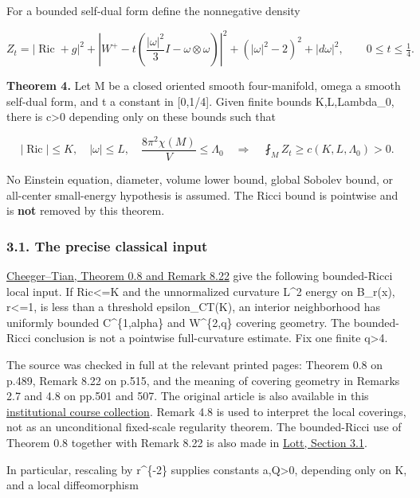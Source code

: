 \documentclass[
  10pt,
]{article}
\begin{document}
For a bounded self-dual form define the nonnegative density

\[
 Z_t=|\operatorname{Ric}+g|^2+
 \left|W^+-t\left(\frac{|\omega|^2}{3}I-\omega\otimes\omega\right)\right|^2
 +(|\omega|^2-2)^2+|d\omega|^2,
 \qquad 0\le t\le\tfrac14.                          \tag{3.1}
\]

\textbf{Theorem 4.} Let M be a closed oriented smooth four-manifold,
omega a smooth self-dual form, and t a constant in {[}0,1/4{]}. Given
finite bounds K,L,Lambda\_0, there is c\textgreater0 depending only on
these bounds such that

\[
 |\operatorname{Ric}|\le K,\quad |\omega|\le L,\quad
 \frac{8\pi^2\chi(M)}{V}\le\Lambda_0
 \quad\Longrightarrow\quad
 \boxed{\fint_M Z_t\ge c(K,L,\Lambda_0)>0.}           \tag{3.2}
\]

No Einstein equation, diameter, volume lower bound, global Sobolev
bound, or all-center small-energy hypothesis is assumed. The Ricci bound
is pointwise and is \textbf{not} removed by this theorem.

\hypertarget{the-precise-classical-input}{%
\subsubsection{3.1. The precise classical
input}\label{the-precise-classical-input}}

\href{https://doi.org/10.1090/S0894-0347-05-00511-4}{Cheeger--Tian,
Theorem 0.8 and Remark 8.22} give the following bounded-Ricci local
input. If \textbar Ric\textbar\textless=K and the unnormalized curvature
L\^{}2 energy on B\_r(x), r\textless=1, is less than a threshold
epsilon\_CT(K), an interior neighborhood has uniformly bounded
C\^{}\{1,alpha\} and W\^{}\{2,q\} covering geometry. The bounded-Ricci
conclusion is not a pointwise full-curvature estimate. Fix one finite
q\textgreater4.

The source was checked in full at the relevant printed pages: Theorem
0.8 on p.489, Remark 8.22 on p.515, and the meaning of covering geometry
in Remarks 2.7 and 4.8 on pp.501 and 507. The original article is also
available in this
\href{https://www.math.stonybrook.edu/Courses/MAT683/201001/MAT683S10.pdf}{institutional
course collection}. Remark 4.8 is used to interpret the local coverings,
not as an unconditional fixed-scale regularity theorem. The
bounded-Ricci use of Theorem 0.8 together with Remark 8.22 is also made
in \href{https://math.berkeley.edu/~lott/4d3.pdf}{Lott, Section 3.1}.

In particular, rescaling by r\^{}\{-2\} supplies constants
a,Q\textgreater0, depending only on K, and a local diffeomorphism
\end{document}
